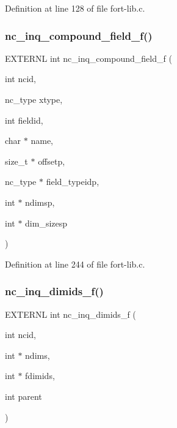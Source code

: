 Definition at line 128 of file fort-\/lib.\+c.

\mbox{\label{fort-lib_8c_a42797cfb64cc969ae8c03b65207e7e85}} 
\subsubsection{\texorpdfstring{nc\+\_\+inq\+\_\+compound\+\_\+field\+\_\+f()}{nc\_inq\_compound\_field\_f()}}
{\footnotesize\ttfamily E\+X\+T\+E\+R\+NL int nc\+\_\+inq\+\_\+compound\+\_\+field\+\_\+f (\begin{DoxyParamCaption}\item[{int}]{ncid,  }\item[{nc\+\_\+type}]{xtype,  }\item[{int}]{fieldid,  }\item[{char $\ast$}]{name,  }\item[{size\+\_\+t $\ast$}]{offsetp,  }\item[{nc\+\_\+type $\ast$}]{field\+\_\+typeidp,  }\item[{int $\ast$}]{ndimsp,  }\item[{int $\ast$}]{dim\+\_\+sizesp }\end{DoxyParamCaption})}



Definition at line 244 of file fort-\/lib.\+c.

\mbox{\label{fort-lib_8c_a4290da001055c538b0753f021cfe3b53}} 
\subsubsection{\texorpdfstring{nc\+\_\+inq\+\_\+dimids\+\_\+f()}{nc\_inq\_dimids\_f()}}
{\footnotesize\ttfamily E\+X\+T\+E\+R\+NL int nc\+\_\+inq\+\_\+dimids\+\_\+f (\begin{DoxyParamCaption}\item[{int}]{ncid,  }\item[{int $\ast$}]{ndims,  }\item[{int $\ast$}]{fdimids,  }\item[{int}]{parent }\end{DoxyParamCaption})}



